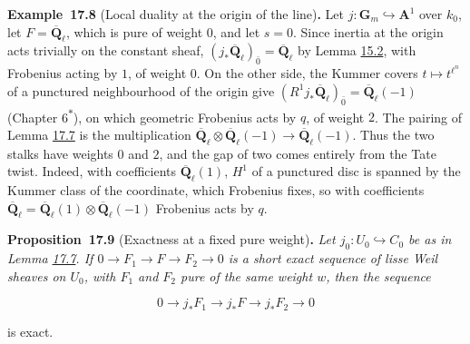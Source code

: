 \documentclass[11pt]{article}
\newenvironment{bpstatement}[2]{\par\addvspace{0.6\baselineskip}\noindent\textbf{#1}#2\textbf{.}\enspace\ignorespaces}
  {\par\addvspace{0.4\baselineskip}}
\newenvironment{bpstatementit}[2]{\begin{bpstatement}{#1}{#2}\itshape\ignorespaces}{\end{bpstatement}}
\newcommand{\bpout}[1]{#1\textsuperscript{\hyperlink{bp-outside}{\ensuremath{\ast}}}}
\begin{document}
\label{bp248}%
\begin{bpstatement}{Example~17.8}{ (Local duality at the origin of the line)}
Let \(j:\mathbf G_m\hookrightarrow\mathbf A^1\) over \(k_0\), let \(F=\overline{\mathbf Q}_\ell\), which is pure of weight \(0\), and let \(s=0\). Since inertia at the origin acts trivially on the constant sheaf, \((j_*\overline{\mathbf Q}_\ell)_{\bar 0}=\overline{\mathbf Q}_\ell\) by Lemma \hyperref[bp127]{15.2}, with Frobenius acting by \(1\), of weight \(0\). On the other side, the Kummer covers \(t\mapsto t^{\ell^n}\) of a punctured neighbourhood of the origin give \((R^1j_*\overline{\mathbf Q}_\ell)_{\bar 0}=\overline{\mathbf Q}_\ell(-1)\) (Chapter \bpout{6}), on which geometric Frobenius acts by \(q\), of weight \(2\). The pairing of Lemma \hyperref[bp245]{17.7} is the multiplication \(\overline{\mathbf Q}_\ell\otimes\overline{\mathbf Q}_\ell(-1)\to\overline{\mathbf Q}_\ell(-1)\). Thus the two stalks have weights \(0\) and \(2\), and the gap of two comes entirely from the Tate twist. Indeed, with coefficients \(\overline{\mathbf Q}_\ell(1)\), \(H^1\) of a punctured disc is spanned by the Kummer class of the coordinate, which Frobenius fixes, so with coefficients \(\overline{\mathbf Q}_\ell=\overline{\mathbf Q}_\ell(1)\otimes\overline{\mathbf Q}_\ell(-1)\) Frobenius acts by \(q\).
\end{bpstatement}

\label{bp249}%
\begin{bpstatementit}{Proposition~17.9}{ (Exactness at a fixed pure weight)}
Let \(j_0:U_0\hookrightarrow C_0\) be as in Lemma \hyperref[bp245]{17.7}. If \(0\to F_1\to F\to F_2\to0\) is a short exact sequence of lisse Weil sheaves on \(U_0\), with \(F_1\) and \(F_2\) pure of the same weight \(w\), then the sequence

\[
0\longrightarrow j_*F_1\longrightarrow j_*F
\longrightarrow j_*F_2\longrightarrow0
\]

is exact.
\end{bpstatementit}
\end{document}

